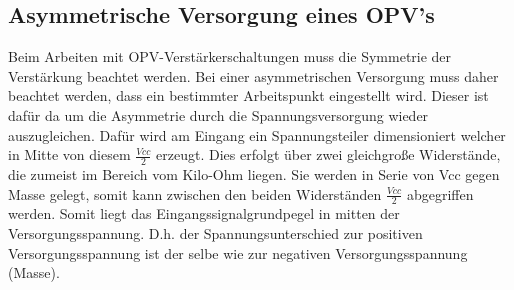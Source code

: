 \subsection{Asymmetrische Versorgung eines OPV's}\label{subsec:8.5.1}
Beim Arbeiten mit OPV-Verstärkerschaltungen muss die Symmetrie der Verstärkung beachtet werden.
Bei einer asymmetrischen Versorgung muss daher beachtet werden, dass ein bestimmter Arbeitspunkt eingestellt wird.
Dieser ist dafür da um die Asymmetrie durch die Spannungsversorgung wieder auszugleichen.
Dafür wird am Eingang ein Spannungsteiler dimensioniert welcher in Mitte von diesem $\frac{Vcc}{2}$ erzeugt.
Dies erfolgt über zwei gleichgroße Widerstände, die zumeist im Bereich vom Kilo-Ohm liegen.
Sie werden in Serie von Vcc gegen Masse gelegt, somit kann zwischen den beiden Widerständen $\frac{Vcc}{2}$ abgegriffen werden.
Somit liegt das Eingangssignalgrundpegel in mitten der Versorgungsspannung.
D.h. der Spannungsunterschied zur positiven Versorgungsspannung ist der selbe wie zur negativen Versorgungsspannung (Masse). 


